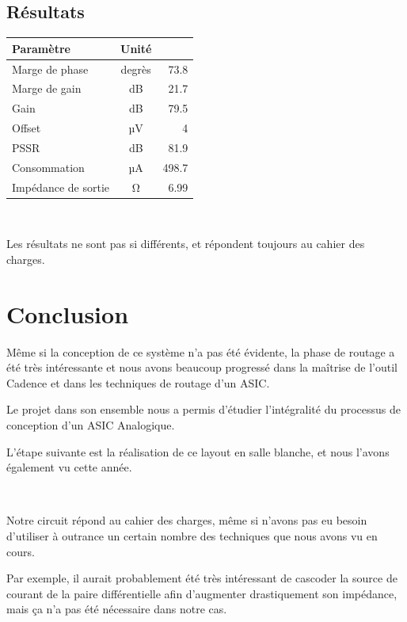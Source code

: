 \documentclass{article}
\begin{document}
\subsection{Résultats}

\begin{center}
\begin{tabular}{|l|c|r|}
    \hline
    Paramètre & Unité & \\
    \hline
    Marge de phase & degrès & 73.8 \\
    \hline
    Marge de gain & dB & 21.7 \\
    \hline
    Gain & dB &  79.5 \\
    \hline
    Offset & µV & 4 \\
    \hline
    PSSR & dB & 81.9 \\
    \hline
    Consommation & µA & 498.7 \\
    \hline
    Impédance de sortie & Ω & 6.99 \\
    \hline
\end{tabular}
\end{center}

~

Les résultats ne sont pas si différents, et répondent toujours au cahier des charges.


\section*{Conclusion}

Même si la conception de ce système n’a pas été évidente, la phase de routage a été très intéressante et nous avons beaucoup progressé dans la maîtrise de l’outil Cadence et dans les techniques de routage d’un ASIC.

Le projet dans son ensemble nous a permis d’étudier l’intégralité du processus de conception d’un ASIC Analogique.

L’étape suivante est la réalisation de ce layout en salle blanche, et nous l’avons également vu cette année.

~

Notre circuit répond au cahier des charges, même si n’avons pas eu besoin d’utiliser à outrance un certain nombre des techniques que nous avons vu en cours.

Par exemple, il aurait probablement été très intéressant de cascoder la source de courant de la paire différentielle afin d’augmenter drastiquement son impédance, mais ça n’a pas été nécessaire dans notre cas.
\end{document}
